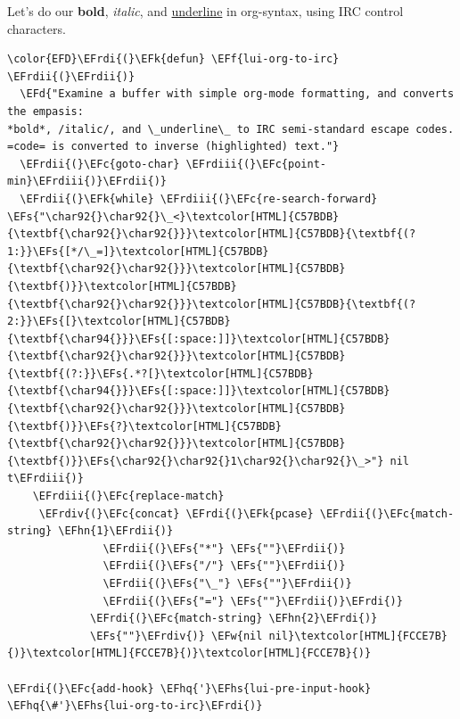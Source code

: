 \documentclass{scrartcl}
\newcommand{\EFk}[1]{\textcolor{EFk}{#1}} %
\newcommand{\EFd}[1]{\textcolor{EFd}{#1}} %
\newcommand{\EFs}[1]{\textcolor{EFs}{#1}} %
\newcommand{\EFw}[1]{\textcolor{EFw}{#1}} %
\newcommand{\EFc}[1]{\textcolor{EFc}{#1}} %
\newcommand{\EFf}[1]{\textcolor{EFf}{#1}} %
\newcommand{\EFhn}[1]{#1} %
\newcommand{\EFhq}[1]{#1} %
\newcommand{\EFhs}[1]{#1} %
\newcommand{\EFrdi}[1]{#1} %
\newcommand{\EFrdii}[1]{#1} %
\newcommand{\EFrdiii}[1]{#1} %
\newcommand{\EFrdiv}[1]{#1} %
\begin{document}
Let's do our \textbf{bold}, \emph{italic}, and \uline{underline} in org-syntax, using IRC control characters.
\begin{Code}
\begin{Verbatim}[]
\color{EFD}\EFrdi{(}\EFk{defun} \EFf{lui-org-to-irc} \EFrdii{(}\EFrdii{)}
  \EFd{"Examine a buffer with simple org-mode formatting, and converts the empasis:
*bold*, /italic/, and \_underline\_ to IRC semi-standard escape codes.
=code= is converted to inverse (highlighted) text."}
  \EFrdii{(}\EFc{goto-char} \EFrdiii{(}\EFc{point-min}\EFrdiii{)}\EFrdii{)}
  \EFrdii{(}\EFk{while} \EFrdiii{(}\EFc{re-search-forward} \EFs{"\char92{}\char92{}\_<}\textcolor[HTML]{C57BDB}{\textbf{\char92{}\char92{}}}\textcolor[HTML]{C57BDB}{\textbf{(?1:}}\EFs{[*/\_=]}\textcolor[HTML]{C57BDB}{\textbf{\char92{}\char92{}}}\textcolor[HTML]{C57BDB}{\textbf{)}}\textcolor[HTML]{C57BDB}{\textbf{\char92{}\char92{}}}\textcolor[HTML]{C57BDB}{\textbf{(?2:}}\EFs{[}\textcolor[HTML]{C57BDB}{\textbf{\char94{}}}\EFs{[:space:]]}\textcolor[HTML]{C57BDB}{\textbf{\char92{}\char92{}}}\textcolor[HTML]{C57BDB}{\textbf{(?:}}\EFs{.*?[}\textcolor[HTML]{C57BDB}{\textbf{\char94{}}}\EFs{[:space:]]}\textcolor[HTML]{C57BDB}{\textbf{\char92{}\char92{}}}\textcolor[HTML]{C57BDB}{\textbf{)}}\EFs{?}\textcolor[HTML]{C57BDB}{\textbf{\char92{}\char92{}}}\textcolor[HTML]{C57BDB}{\textbf{)}}\EFs{\char92{}\char92{}1\char92{}\char92{}\_>"} nil t\EFrdiii{)}
    \EFrdiii{(}\EFc{replace-match}
     \EFrdiv{(}\EFc{concat} \EFrdi{(}\EFk{pcase} \EFrdii{(}\EFc{match-string} \EFhn{1}\EFrdii{)}
               \EFrdii{(}\EFs{"*"} \EFs{""}\EFrdii{)}
               \EFrdii{(}\EFs{"/"} \EFs{""}\EFrdii{)}
               \EFrdii{(}\EFs{"\_"} \EFs{""}\EFrdii{)}
               \EFrdii{(}\EFs{"="} \EFs{""}\EFrdii{)}\EFrdi{)}
             \EFrdi{(}\EFc{match-string} \EFhn{2}\EFrdi{)}
             \EFs{""}\EFrdiv{)} \EFw{nil nil}\textcolor[HTML]{FCCE7B}{)}\textcolor[HTML]{FCCE7B}{)}\textcolor[HTML]{FCCE7B}{)}

\EFrdi{(}\EFc{add-hook} \EFhq{'}\EFhs{lui-pre-input-hook} \EFhq{\#'}\EFhs{lui-org-to-irc}\EFrdi{)}
\end{Verbatim}
\end{Code}
\end{document}
